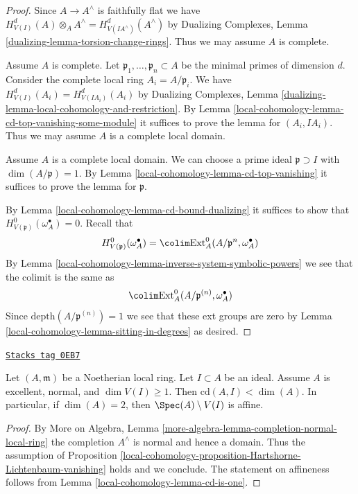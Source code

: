 \begin{proof}
Since $A \to A^\wedge$ is faithfully flat we have
$H^d_{V(I)}(A) \otimes_A A^\wedge = H^d_{V(IA^\wedge)}(A^\wedge)$
by Dualizing Complexes, Lemma \ref{dualizing-lemma-torsion-change-rings}.
Thus we may assume $A$ is complete.

\medskip\noindent
Assume $A$ is complete. Let $\mathfrak p_1, \ldots, \mathfrak p_n \subset A$
be the minimal primes of dimension $d$. Consider the complete local ring
$A_i = A/\mathfrak p_i$. We have $H^d_{V(I)}(A_i) = H^d_{V(IA_i)}(A_i)$
by Dualizing Complexes, Lemma
\ref{dualizing-lemma-local-cohomology-and-restriction}.
By Lemma \ref{local-cohomology-lemma-cd-top-vanishing-some-module}
it suffices to prove the lemma for $(A_i, IA_i)$.
Thus we may assume $A$ is a complete local domain.

\medskip\noindent
Assume $A$ is a complete local domain. We can choose a prime ideal
$\mathfrak p \supset I$ with $\dim(A/\mathfrak p) = 1$.
By Lemma \ref{local-cohomology-lemma-cd-top-vanishing}
it suffices to prove the lemma for $\mathfrak p$.

\medskip\noindent
By Lemma \ref{local-cohomology-lemma-cd-bound-dualizing} it suffices to show that
$H^0_{V(\mathfrak p)}(\omega_A^\bullet) = 0$.
Recall that
$$
H^0_{V(\mathfrak p)}(\omega_A^\bullet) =
\colim \text{Ext}^0_A(A/\mathfrak p^n, \omega_A^\bullet)
$$
By Lemma \ref{local-cohomology-lemma-inverse-system-symbolic-powers}
we see that the colimit is the same as
$$
\colim \text{Ext}^0_A(A/\mathfrak p^{(n)}, \omega_A^\bullet)
$$
Since $\text{depth}(A/\mathfrak p^{(n)}) = 1$ we see that
these ext groups are zero by Lemma \ref{local-cohomology-lemma-sitting-in-degrees}
as desired.
\end{proof}

\begin{lemma}
\label{local-cohomology-lemma-affine-complement}
\href{https://stacks.math.columbia.edu/tag/0EB7}{\texttt{Stacks tag 0EB7}}

Let $(A, \mathfrak m)$ be a Noetherian local ring.
Let $I \subset A$ be an ideal. Assume $A$ is excellent,
normal, and $\dim V(I) \geq 1$. Then $\text{cd}(A, I) < \dim(A)$.
In particular, if $\dim(A) = 2$, then $\Spec(A) \setminus V(I)$ is affine.
\end{lemma}

\begin{proof}
By More on Algebra, Lemma
\ref{more-algebra-lemma-completion-normal-local-ring}
the completion $A^\wedge$ is normal and hence a domain.
Thus the assumption of
Proposition \ref{local-cohomology-proposition-Hartshorne-Lichtenbaum-vanishing}
holds and we conclude. The statement on affineness
follows from Lemma \ref{local-cohomology-lemma-cd-is-one}.
\end{proof}

